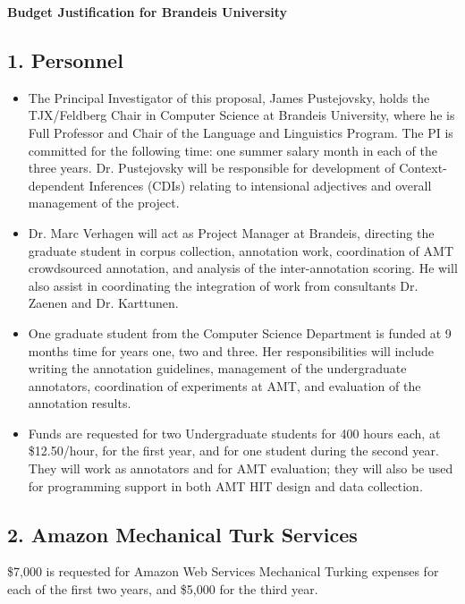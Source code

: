 \documentclass[11pt]{article}
\begin{document}
\begin{center}
{\large {\bf Budget Justification for Brandeis University}}
\end{center}

 \vspace{-1.0em}
\subsection*{1. Personnel}


\begin{itemize}

\item The Principal Investigator of this proposal, James Pustejovsky, holds the TJX/Feldberg Chair in Computer Science at Brandeis University, where he is Full Professor and Chair of the Language and Linguistics Program. The PI is committed for the following time: one summer salary month in each of the three years.  Dr. Pustejovsky will be responsible for   development of Context-dependent Inferences (CDIs) relating to intensional adjectives and overall management of the project. 

\item Dr. Marc Verhagen will act as Project Manager at Brandeis, directing the graduate student in corpus collection, annotation work, coordination of AMT crowdsourced annotation, and analysis of the inter-annotation scoring. He will also assist in coordinating the integration of work from consultants Dr. Zaenen and Dr. Karttunen. 

 
\item One graduate student from the Computer Science Department is funded at 9 months time for years one, two and three.  Her responsibilities will include writing the annotation guidelines, management of the undergraduate annotators, coordination of experiments at AMT, and 
 evaluation of the annotation results. 
 
\item Funds are requested for two Undergraduate students for 400 hours each, at \$12.50/hour, for the first year, and for one student  during the second year. They will work as annotators and for AMT evaluation; they will also be used for programming support in both AMT HIT design and data collection.  

\end{itemize}

\subsection*{2.  Amazon Mechanical Turk Services}
\$7,000 is requested for Amazon Web Services  Mechanical Turking expenses for each of the first two years, and \$5,000 for the third year.  
\end{document}
